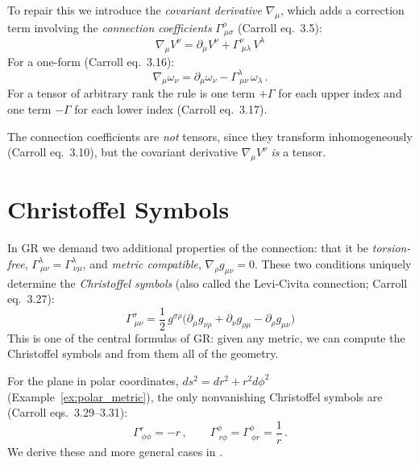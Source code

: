To repair this we introduce the \emph{covariant derivative} $\nabla_\mu$,
which adds a correction term involving the \emph{connection coefficients}
$\Gamma^\rho_{\ \mu\sigma}$ (Carroll eq.~3.5):
\begin{equation}
    \boxed{
    \nabla_\mu V^\nu = \partial_\mu V^\nu + \Gamma^\nu_{\ \mu\lambda}\, V^\lambda
    }
    \label{eq:cov_deriv_vector}
\end{equation}
For a one-form (Carroll eq.~3.16):
\begin{equation}
    \nabla_\mu \omega_\nu = \partial_\mu \omega_\nu
    - \Gamma^\lambda_{\ \mu\nu}\, \omega_\lambda \,.
    \label{eq:cov_deriv_oneform}
\end{equation}
For a tensor of arbitrary rank the rule is one term $+\Gamma$ for each upper
index and one term $-\Gamma$ for each lower index (Carroll eq.~3.17).

The connection coefficients are \emph{not} tensors, since they transform
inhomogeneously (Carroll eq.~3.10), but the covariant derivative
$\nabla_\mu V^\nu$ \emph{is} a tensor.


\section{Christoffel Symbols}
\label{sec:christoffel}

In GR we demand two additional properties of the connection: that it be
\emph{torsion-free}, $\Gamma^\lambda_{\ \mu\nu} = \Gamma^\lambda_{\ \nu\mu}$,
and \emph{metric compatible}, $\nabla_\rho g_{\mu\nu} = 0$.
These two conditions uniquely determine the \emph{Christoffel symbols} (also called
the Levi-Civita connection; Carroll eq.~3.27):
\begin{equation}
    \boxed{
    \Gamma^\sigma_{\ \mu\nu} = \frac{1}{2}\, g^{\sigma\rho}
    \bigl(\partial_\mu g_{\nu\rho} + \partial_\nu g_{\rho\mu}
    - \partial_\rho g_{\mu\nu}\bigr)
    }
    \label{eq:christoffel}
\end{equation}
This is one of the central formulas of GR: given any metric,
we can compute the Christoffel symbols and from them all of the geometry.

\begin{example}
For the plane in polar coordinates, $ds^2 = dr^2 + r^2 d\phi^2$
(Example~\ref{ex:polar_metric}), the only nonvanishing Christoffel
symbols are (Carroll eqs.~3.29--3.31):
\begin{equation}
    \Gamma^r_{\ \phi\phi} = -r \,, \qquad
    \Gamma^\phi_{\ r\phi} = \Gamma^\phi_{\ \phi r} = \frac{1}{r} \,.
    \label{eq:christoffel_polar}
\end{equation}
We derive these and more general cases in
.
\end{example}


